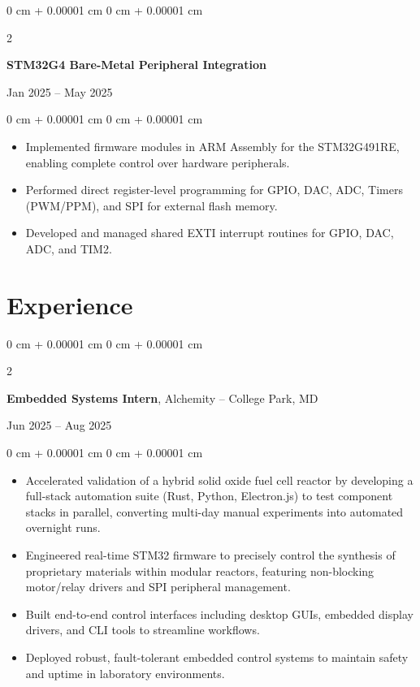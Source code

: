 \documentclass[10pt, letterpaper]{article}
\newenvironment{highlights}{
    \begin{itemize}[
        topsep=0.05 cm,
        parsep=0.05 cm,
        partopsep=0pt,
        itemsep=0pt,
        leftmargin=0 cm + 10pt
    ]
}{
    \end{itemize}
}
\newenvironment{onecolentry}{
    \begin{adjustwidth}{
        0 cm + 0.00001 cm
    }{
        0 cm + 0.00001 cm
    }
}{
    \end{adjustwidth}
}
\newenvironment{twocolentry}[2][]{
    \onecolentry
    \def\secondColumn{#2}
    \setcolumnwidth{\fill, 4.5 cm}
    \begin{paracol}{2}
}{
    \switchcolumn \raggedleft \secondColumn
    \end{paracol}
    \endonecolentry
}
\begin{document}
        \begin{twocolentry}{
            Jan 2025 – May 2025
        }
            \textbf{STM32G4 Bare-Metal Peripheral Integration}
        \end{twocolentry}
        \vspace{0.05 cm}
        \begin{onecolentry}
            \begin{highlights}
                \item Implemented firmware modules in ARM Assembly for the STM32G491RE, enabling complete control over hardware peripherals.
                \item Performed direct register-level programming for GPIO, DAC, ADC, Timers (PWM/PPM), and SPI for external flash memory.
                \item Developed and managed shared EXTI interrupt routines for GPIO, DAC, ADC, and TIM2.
            \end{highlights}
        \end{onecolentry}
    \section{Experience}
        
        \begin{twocolentry}{
            Jun 2025 – Aug 2025
        }
            \textbf{Embedded Systems Intern}, Alchemity -- College Park, MD
        \end{twocolentry}
        \vspace{0.05 cm}
        \begin{onecolentry}
            \begin{highlights}
                \item Accelerated validation of a hybrid solid oxide fuel cell reactor by developing a full-stack automation suite (Rust, Python, Electron.js) to test component stacks in parallel, converting multi-day manual experiments into automated overnight runs.
                \item Engineered real-time STM32 firmware to precisely control the synthesis of proprietary materials within modular reactors, featuring non-blocking motor/relay drivers and SPI peripheral management.
                \item Built end-to-end control interfaces including desktop GUIs, embedded display drivers, and CLI tools to streamline workflows.
                \item Deployed robust, fault-tolerant embedded control systems to maintain safety and uptime in laboratory environments.
            \end{highlights}
        \end{onecolentry}
\end{document}
